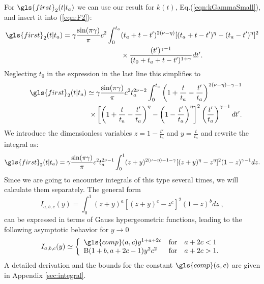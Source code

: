 For $\gls{first}_{2}(t|t_a)$ we can use our result for $k(t)$, Eq.(\ref{eqn:kGammaSmall}), and insert it into (\ref{eqn:F2}): 
\begin{align}
\gls{first}_{2}(t|t_a) = \gamma\frac{\sin(\pi \gamma)}{\pi}  c^2 \int^{t_a}_0 & (t_a+t-t')^{2(\nu-\eta)}[(t_a+t-t')^\eta-(t_a-t')^\eta]^2  \nonumber \\
& \times \frac{(t')^{\gamma-1}}{(t_0+t_a+t-t')^{1+\gamma}} dt'.
\end{align}
%
Neglecting $t_0$ in the expression in the last line this simplifies to
%
\begin{align}
&& \gls{first}_{2}(t|t_a) \simeq  \gamma \frac{\sin(\pi \gamma)}{\pi}  c^2 t_a^{2\nu-2} \int^{t_a}_0 \left(1+\frac{t}{t_a}-\frac{t'}{t_a} \right)^{2(\nu-\eta)-\gamma-1} \nonumber \\
&& \;\; \times \left[ \left(1+\frac{t}{t_a}-\frac{t'}{t_a} \right)^\eta-\left(1- \frac{t'}{t_a}\right)^\eta \right]^2 \left( \frac{t'}{t_a}\right)^{\gamma-1} dt' .
\end{align}
%
We introduce the dimensionless variables $z = 1-\frac{t'}{t_a}$ and $y = \frac{t}{t_a}$ and rewrite the integral as:
%
\begin{align}
 \gls{first}_{2}(t|t_a) = \gamma \frac{\sin(\pi \gamma)}{\pi}  c^2 t_a^{2\nu-1}  \int^{1}_0 (z+y)^{2(\nu-\eta)-1-\gamma}[(z+y)^\eta-z^\eta]^2 (1-z)^{\gamma-1} dz . 
\end{align}
Since we are going to encounter integrals of this type several times, we will calculate them separately. The general form
\begin{equation}
I_{a,b,c}(y) = \int^{1}_0 (z+y)^{a}[(z+y)^c-z^c]^2 (1-z)^{b} dz \; , \label{eqn:Iabc} 
\end{equation}
can be expressed in terms of Gauss hypergeometric functions, leading to the following asymptotic behavior for $y \to 0$
\begin{equation}
I_{a,b,c}(y) \simeq \left\{ \begin{array}{l l l}
\gls{comp}(a,c) y^{1+a+2c}    & \mathrm{for} &  a+2c < 1 \\
 \mathrm{B}(1+b,a+2c-1)y^2 c^2  & \mathrm{for} & a+2c > 1.
\end{array} \right. \label{eqn:IabcAsymptotic}
\end{equation}
A detailed derivation and the bounds for the constant $\gls{comp}(a,c)$ are given in Appendix \ref{sec:integral}.

